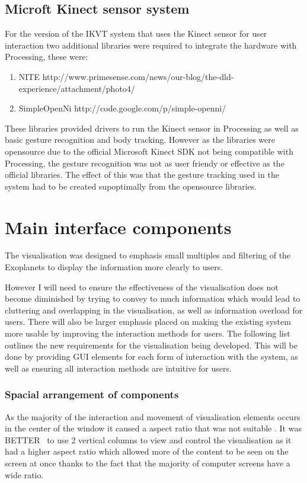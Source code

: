 \subsection{Microft Kinect sensor system}
For the version of the IKVT system that uses the Kinect sensor for user
interaction two additional libraries were required to integrate the hardware
with Processing, these were:
\begin{enumerate}
 \item NITE
http://www.primesense.com/news/our-blog/the-dld-experience/attachment/photo4/~
 \item SimpleOpenNi http://code.google.com/p/simple-openni/~
\end{enumerate}
These libraries provided drivers to run the Kinect sensor in Processing as well
as basic gesture recognition and body tracking. However as the libraries were
opensource due to the official Microsoft Kinect SDK not being compatible with
Processing, the gesture recognition was not as user friendy or effective as the
official libraries. The effect of this was that the gesture tracking used in the
system had to be created supoptimally from the opensource libraries. 

\section{Main interface components}
The visualisation was designed to emphasis small multiples and filtering of the
Exoplanets to display the information more clearly to users.

However I will need to ensure the effectiveness of the visualisation does not
become diminished by trying to convey to much information which would lead to
cluttering and overlapping in the visualisation, as well as information overload
for users. There will also be larger emphasis placed on making the existing
system more usable by improving the interaction methods for users. The following
list outlines the new requirements for the visualisation being developed. This
will be done by providing GUI elements for each form of interaction with the
system, as well as ensuring all interaction methods are intuitive for users. 

\subsubsection{Spacial arrangement of components}
As the majority of the interaction and movement of visualisation elements occurs
in the center of the window it caused a aspect ratio that was not suitable . It
was BETTER~ to use 2 vertical columns to view and control the visualisation as
it had a higher aspect ratio which allowed more of the content to be seen on the
screen at once thanks to the fact that the majority of computer screens have a
wide ratio.


